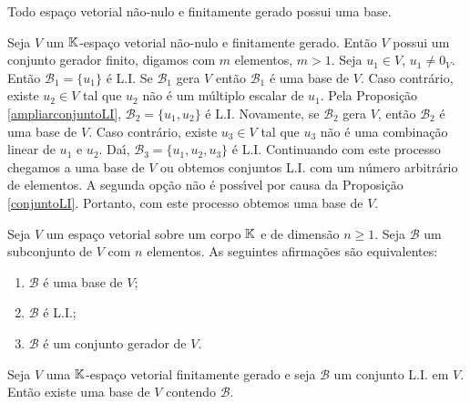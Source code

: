 \begin{teorema}
	Todo espa\c{c}o vetorial n\~ao-nulo e finitamente gerado possui uma base.
\end{teorema}
\begin{prova}
	Seja $V$ um $\mathbb{K}$-espa\c{c}o vetorial n\~ao-nulo e finitamente gerado. Ent\~ao $V$ possui um conjunto gerador finito, digamos com $m$ elementos, $m > 1$. Seja $u_1 \in V$, $u_1 \ne 0_V$. Ent\~ao $\mathcal{B}_1 = \{u_1\}$ \'e L.I. Se $\mathcal{B}_1$ gera $V$ ent\~ao $\mathcal{B}_1$ \'e uma base de $V$. Caso contr\'ario, existe $u_2 \in V$ tal que $u_2$ n\~ao \'e um m\'ultiplo escalar de $u_1$. Pela Proposi\c{c}\~ao \ref{ampliarconjuntoLI}, $\mathcal{B}_2 = \{u_1, u_2\}$ \'e L.I. Novamente, se $\mathcal{B}_2$ gera $V$, ent\~ao $\mathcal{B}_2$ \'e uma base de $V$. Caso contr\'ario, existe $u_3 \in V$ tal que $u_3$ n\~ao \'e uma combina\c{c}\~ao linear de $u_1$ e $u_2$. Da{\'\i}, $\mathcal{B}_3 = \{u_1, u_2, u_3\}$ \'e L.I. Continuando com este processo chegamos a uma base de $V$ ou obtemos conjuntos L.I. com um n\'umero arbitr\'ario de elementos. A segunda op\c{c}\~ao n\~ao \'e poss{\'\i}vel por causa da Proposi\c{c}\~ao \ref{conjuntoLI}. Portanto, com este processo obtemos uma base de $V$.
\end{prova}

\begin{corolario}
	Seja $V$ um espa\c{c}o vetorial sobre um corpo $\mathbb{K}$ e de dimens\~ao $n \ge 1$. Seja $\mathcal{B}$ um subconjunto de $V$ com $n$ elementos. As seguintes afirma\c{c}\~oes s\~ao equivalentes:
	\begin{enumerate}[label={\roman*})]
		\item $\mathcal{B}$ \'e uma base de $V$;
		\item $\mathcal{B}$ \'e L.I.;
		\item $\mathcal{B}$ \'e um conjunto gerador de $V$.
	\end{enumerate}
\end{corolario}

\begin{teorema}\label{basecontendoconjuntoLI}
	Seja $V$ uma $\mathbb{K}$-espa\c{c}o vetorial finitamente gerado e seja $\mathcal{B}$ um conjunto L.I. em $V$. Ent\~ao existe uma base de $V$ contendo $\mathcal{B}$.
\end{teorema}

